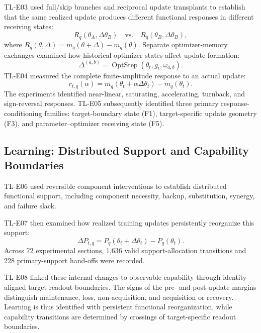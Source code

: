 \documentclass[12pt,letterpaper]{article}
\begin{document}
TL-E03 used full/skip branches and reciprocal update transplants to establish that the same realized update produces different functional responses in different receiving states:
\begin{equation}
 R_q(\theta_A,\Delta\theta_B)\quad\text{vs.}\quad R_q(\theta_B,\Delta\theta_B),
 \label{eq:receiver}
\end{equation}
where $R_q(\theta,\Delta)=m_q(\theta+\Delta)-m_q(\theta)$. Separate optimizer-memory exchanges examined how historical optimizer states affect update formation:
\begin{equation}
 \Delta^{(a,b)}=\operatorname{OptStep}(\theta_t,g_t,\omega_{a,b}).
 \label{eq:optmem}
\end{equation}
TL-E04 measured the complete finite-amplitude response to an actual update:
\begin{equation}
 r_{t,q}(\alpha)=m_q(\theta_t+\alpha\Delta\theta_t)-m_q(\theta_t).
 \label{eq:response}
\end{equation}
The experiments identified near-linear, saturating, accelerating, turnback, and sign-reversal responses. TL-E05 subsequently identified three primary response-conditioning families: target-boundary state (F1), target-specific update geometry (F3), and parameter--optimizer receiving state (F5).

\subsection{Learning: Distributed Support and Capability Boundaries}
TL-E06 used reversible component interventions to establish distributed functional support, including component necessity, backup, substitution, synergy, and failure slack.

TL-E07 then examined how realized training updates persistently reorganize this support:
\begin{equation}
 \Delta P_{t,q}=P_q(\theta_t+\Delta\theta_t)-P_q(\theta_t).
 \label{eq:realloc}
\end{equation}
Across 72 experimental sections, 1,636 valid support-allocation transitions and 228 primary-support hand-offs were recorded.

TL-E08 linked these internal changes to observable capability through identity-aligned target readout boundaries. The signs of the pre- and post-update margins distinguish maintenance, loss, non-acquisition, and acquisition or recovery. Learning is thus identified with persistent functional reorganization, while capability transitions are determined by crossings of target-specific readout boundaries.
\end{document}

